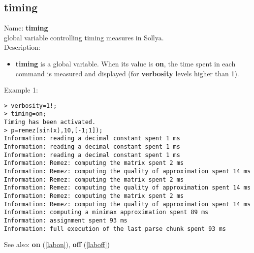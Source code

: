 \subsection{timing}
\label{labtiming}
\noindent Name: \textbf{timing}\\
global variable controlling timing measures in Sollya.\\

\noindent Description: \begin{itemize}

\item \textbf{timing} is a global variable. When its value is \textbf{on}, the time spent in each 
   command is measured and displayed (for \textbf{verbosity} levels higher than 1).
\end{itemize}
\noindent Example 1: 
\begin{center}\begin{minipage}{15cm}\begin{Verbatim}[frame=single]
> verbosity=1!;
> timing=on;
Timing has been activated.
> p=remez(sin(x),10,[-1;1]);
Information: reading a decimal constant spent 1 ms
Information: reading a decimal constant spent 1 ms
Information: reading a decimal constant spent 1 ms
Information: Remez: computing the matrix spent 2 ms
Information: Remez: computing the quality of approximation spent 14 ms
Information: Remez: computing the matrix spent 2 ms
Information: Remez: computing the quality of approximation spent 14 ms
Information: Remez: computing the matrix spent 2 ms
Information: Remez: computing the quality of approximation spent 14 ms
Information: computing a minimax approximation spent 89 ms
Information: assignment spent 93 ms
Information: full execution of the last parse chunk spent 93 ms
\end{Verbatim}
\end{minipage}\end{center}
See also: \textbf{on} (\ref{labon}), \textbf{off} (\ref{laboff})
